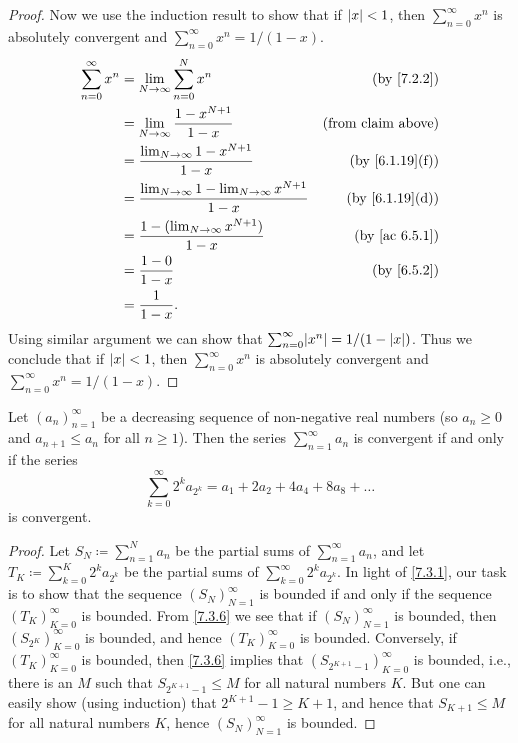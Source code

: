 \begin{proof}
  Now we use the induction result to show that if \(\left\lvert x\right\rvert < 1\), then \(\sum_{n = 0}^\infty x^n\) is absolutely convergent and \(\sum_{n = 0}^\infty x^n = 1 / (1 - x)\).
  \begin{align*}
    \sum_{n = 0}^\infty x^n & = \lim_{N \to \infty} \sum_{n = 0}^N x^n                              & \text{(by \cref{7.2.2})}     \\
                            & = \lim_{N \to \infty} \frac{1 - x^{N + 1}}{1 - x}                     & \text{(from claim above)}    \\
                            & = \frac{\lim_{N \to \infty} 1 - x^{N + 1}}{1 - x}                     & \text{(by \cref{6.1.19}(f))} \\
                            & = \frac{\lim_{N \to \infty} 1 - \lim_{N \to \infty} x^{N + 1}}{1 - x} & \text{(by \cref{6.1.19}(d))} \\
                            & = \frac{1 - (\lim_{N \to \infty} x^{N + 1})}{1 - x}                   & \text{(by \cref{ac 6.5.1})}  \\
                            & = \frac{1 - 0}{1 - x}                                                 & \text{(by \cref{6.5.2})}     \\
                            & = \frac{1}{1 - x}.
  \end{align*}
  Using similar argument we can show that \(\sum_{n = 0}^\infty \abs{x^n} = 1 / (1 - \abs{x})\).
  Thus we conclude that if \(\left\lvert x\right\rvert < 1\), then \(\sum_{n = 0}^\infty x^n\) is absolutely convergent and \(\sum_{n = 0}^\infty x^n = 1 / (1 - x)\).
\end{proof}

\begin{proposition}\label{7.3.4}
  Let \((a_n)_{n = 1}^\infty\) be a decreasing sequence of non-negative real numbers
  (so \(a_n \geq 0\) and \(a_{n + 1} \leq a_n\) for all \(n \geq 1\)).
  Then the series \(\sum_{n = 1}^\infty a_n\) is convergent if and only if the series
  \[
    \sum_{k = 0}^\infty 2^k a_{2^k} = a_1 + 2a_2 + 4a_4 + 8a_8 + \dots
  \]
  is convergent.
\end{proposition}

\begin{proof}
  Let \(S_N \coloneqq \sum_{n = 1}^N a_n\) be the partial sums of \(\sum_{n = 1}^\infty a_n\), and let \(T_K \coloneqq \sum_{k = 0}^K 2^k a_{2^k}\) be the partial sums of \(\sum_{k = 0}^\infty 2^k a_{2^k}\).
  In light of \cref{7.3.1}, our task is to show that the sequence \((S_N)_{N = 1}^\infty\) is bounded if and only if the sequence \((T_K)_{K = 0}^\infty\) is bounded.
  From \cref{7.3.6} we see that if \((S_N)_{N = 1}^\infty\) is bounded, then \((S_{2^K})_{K = 0}^\infty\) is bounded, and hence \((T_K)_{K = 0}^\infty\) is bounded.
  Conversely, if \((T_K)_{K = 0}^\infty\) is bounded, then \cref{7.3.6} implies that \((S_{2^{K + 1} - 1})_{K = 0}^\infty\) is bounded, i.e., there is an \(M\) such that \(S_{2^{K + 1} - 1} \leq M\) for all natural numbers \(K\).
  But one can easily show (using induction) that \(2^{K + 1} - 1 \geq K + 1\), and hence that \(S_{K + 1} \leq M\) for all natural numbers \(K\), hence \((S_N)_{N = 1}^\infty\) is bounded.
\end{proof}

